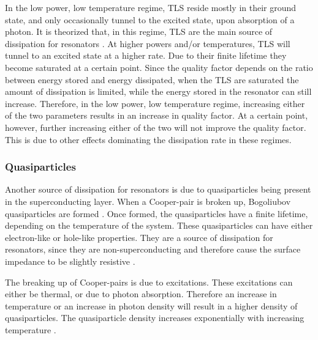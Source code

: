       In the low power, low temperature regime, TLS reside mostly in their ground state, and only occasionally tunnel to the excited state, upon absorption of a photon. It is theorized that, in this regime, TLS are the main source of dissipation for resonators \cite{gao2008experimental}. At higher powers and/or temperatures, TLS will tunnel to an excited state at a higher rate. Due to their finite lifetime they become saturated at a certain point. Since the quality factor depends on the ratio between energy stored and energy dissipated, when the TLS are saturated the amount of dissipation is limited, while the energy stored in the resonator can still increase. Therefore, in the low power, low temperature regime, increasing either of the two parameters results in an increase in quality factor. At a certain point, however, further increasing either of the two will not improve the quality factor. This is due to other effects dominating the dissipation rate in these regimes.




    \subsubsection{Quasiparticles}

      Another source of dissipation for resonators is due to quasiparticles being present in the superconducting layer. When a Cooper-pair is broken up, Bogoliubov quasiparticles are formed \cite[p16]{Barends}. Once formed, the quasiparticles have a finite lifetime, depending on the temperature of the system. These quasiparticles can have either electron-like or hole-like properties. They are a source of dissipation for resonators, since they are non-superconducting and therefore cause the surface impedance to be slightly resistive \cite[p18]{Mazin}.

      The breaking up of Cooper-pairs is due to excitations. These excitations can either be thermal, or due to photon absorption. Therefore an increase in temperature or an increase in photon density will result in a higher density of quasiparticles. The quasiparticle density increases exponentially with increasing temperature \cite[p44]{Mazin}.

